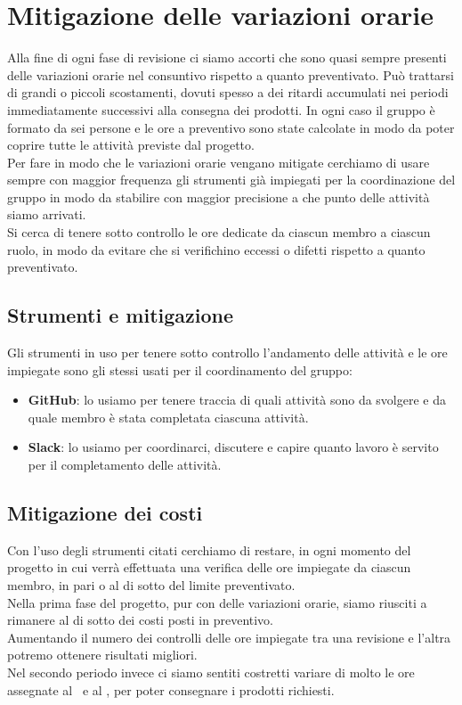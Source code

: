\newpage

\section{Mitigazione delle variazioni orarie}	\label{mitigazione variazioni}
Alla fine di ogni fase di revisione ci siamo accorti che sono quasi sempre presenti delle variazioni orarie nel consuntivo rispetto a quanto preventivato.
Può trattarsi di grandi o piccoli scostamenti, dovuti spesso a dei ritardi accumulati nei periodi immediatamente successivi alla consegna dei prodotti. In ogni caso il gruppo è formato da sei persone e le ore a preventivo sono state calcolate in modo da poter coprire tutte le attività previste dal progetto.\\
Per fare in modo che le variazioni orarie vengano mitigate cerchiamo di usare sempre con maggior frequenza gli strumenti già impiegati per la coordinazione del gruppo in modo da stabilire con maggior precisione a che punto delle attività siamo arrivati.\\
Si cerca di tenere sotto controllo le ore dedicate da ciascun membro a ciascun ruolo, in modo da evitare che si verifichino eccessi o difetti rispetto a quanto preventivato.

    \subsection{Strumenti e mitigazione}
	Gli strumenti in uso per tenere sotto controllo l'andamento delle attività e le ore impiegate sono gli stessi usati per il coordinamento del gruppo:
	\begin{itemize}
	    \item \textbf{GitHub}: lo usiamo per tenere traccia di quali attività sono da svolgere e da quale membro è stata completata ciascuna attività.
	    \item \textbf{Slack}: lo usiamo per coordinarci, discutere e capire quanto lavoro è servito per il completamento delle attività.
	\end{itemize}
	
	\subsection{Mitigazione dei costi}
	Con l'uso degli strumenti citati cerchiamo di restare, in ogni momento del progetto in cui verrà effettuata una verifica delle ore impiegate da ciascun membro, in pari o al di sotto del limite preventivato.\\
	Nella prima fase del progetto, pur con delle variazioni orarie, siamo riusciti a rimanere al di sotto dei costi posti in preventivo.\\
	Aumentando il numero dei controlli delle ore impiegate tra una revisione e l'altra potremo ottenere risultati migliori.\\
    Nel secondo periodo invece ci siamo sentiti costretti variare di molto le ore assegnate al \Progr\ e al \Prog, per poter consegnare i prodotti richiesti.


